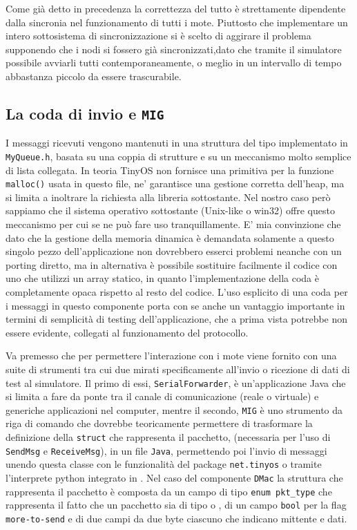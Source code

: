 \documentclass[twoside,11pt,a4paper,italian,openany]{book}
\begin{document}
Come già detto in precedenza la correttezza del tutto è strettamente dipendente dalla sincronia 
nel funzionamento di tutti i mote. Piuttosto che implementare un intero sottosistema 
di sincronizzazione si è scelto di aggirare il problema supponendo che i nodi si fossero già 
sincronizzati,dato che  tramite il simulatore possibile avviarli tutti contemporaneamente,
 o meglio in un intervallo di tempo abbastanza piccolo da essere trascurabile. 

\subsection{La coda di invio e \texttt{MIG}}
I messaggi ricevuti vengono mantenuti in una struttura del tipo implementato in
 \texttt{MyQueue.h},
basata su una coppia di strutture e su un meccanismo molto semplice di lista collegata. 
In teoria TinyOS non fornisce una primitiva per la funzione \texttt{malloc()} usata in questo 
file, ne' garantisce una gestione corretta dell'heap, ma si limita a inoltrare la richiesta 
alla libreria sottostante.  Nel nostro caso però sappiamo che il sistema operativo sottostante 
(Unix-like o win32) offre questo meccanismo per cui se ne può fare uso tranquillamente. 
E' mia convinzione che dato che la gestione della memoria dinamica è demandata solamente a 
questo singolo pezzo dell'applicazione non dovrebbero esserci problemi neanche con un porting 
diretto, ma in alternativa è possibile sostituire facilmente il codice con uno che utilizzi un 
array statico, in quanto l'implementazione della coda è completamente opaca rispetto al 
resto del codice. 
L'uso esplicito di una coda per i messaggi in questo componente porta con se anche un 
vantaggio importante in termini di semplicità di testing dell'applicazione, che a prima vista 
potrebbe non essere evidente, collegati al funzionamento del protocollo. 

Va premesso che per permettere l'interazione con i mote \tos viene fornito con una suite di 
strumenti tra cui due mirati specificamente all'invio o ricezione di dati di test al simulatore. 
Il primo di essi, \texttt{SerialForwarder}, è un'applicazione Java che si limita a fare da ponte 
tra il canale di comunicazione (reale o virtuale) e generiche applicazioni nel computer, mentre 
il secondo, \texttt{MIG} è uno strumento da riga di comando che dovrebbe teoricamente 
permettere di trasformare la definizione della \texttt{struct} che rappresenta il pacchetto, 
(necessaria per l'uso di \texttt{SendMsg} e \texttt{ReceiveMsg}), in un file \texttt{Java}, 
permettendo poi l'invio di messaggi unendo questa classe con le  funzionalità del package 
\texttt{net.tinyos} o tramite l'interprete python integrato in \tv. 
Nel caso del componente \texttt{DMac} la struttura che rappresenta il pacchetto è composta da un campo di tipo \texttt{enum pkt\_type} che rappresenta il fatto che un pacchetto sia di 
tipo \req o \ack, di un campo \texttt{bool} 
per la flag \texttt{more-to-send} e di due campi da due byte ciascuno che indicano 
mittente e dati.
\end{document}
